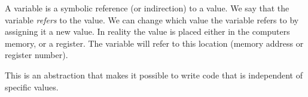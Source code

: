 A variable is a symbolic reference (or indirection) to a value. We say that the variable \textsl{refers} to the value. We can change which value the variable refers to by assigning it a new value. In reality the value is placed either in the computers memory, or a register. The variable will refer to this location (memory address or register number).

This is an abstraction that makes it possible to write code that is independent of specific values.


